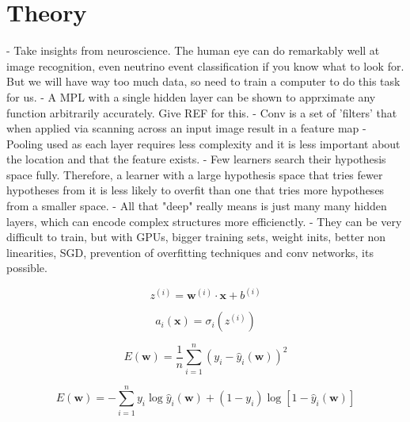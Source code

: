 \section{Theory}
\label{sec:cvn_theory}
- Take insights from neuroscience. The human eye can do remarkably well at image recognition, even neutrino event classification if
you know what to look for. But we will have way too much data, so need to train a computer to do this task for us.
- A MPL with a single hidden layer can be shown to apprximate any function arbitrarily accurately. Give REF for this.
- Conv is a set of 'filters' that when applied via scanning across an input image result in a feature map
- Pooling used as each layer requires less complexity and it is less important about the location and that the feature exists.
- Few learners search their hypothesis space fully. Therefore, a learner with a large hypothesis space that tries fewer hypotheses from it is less likely to overfit than one that tries more hypotheses from a smaller space.
- All that "deep" really means is just many many hidden layers, which can encode complex structures more efficienctly.
- They can be very difficult to train, but with GPUs, bigger training sets, weight inits, better non linearities, SGD, prevention of overfitting techniques and conv networks, its possible.

\begin{equation} %
    z^{(i)}=\boldsymbol{w}^{(i)}\cdot\boldsymbol{x}+b^{(i)}
\end{equation} %

\begin{equation} %
    a_{i}(\boldsymbol{x})=\sigma_i(z^{(i)})
\end{equation} %

\begin{equation} %
    E(\boldsymbol{w})=
    \frac{1}{n}\displaystyle\sum_{i=1}^{n}(y_{i}-
    \hat{y}_{i}(\boldsymbol{w}))^{2}
\end{equation} %

\begin{equation} %
    E(\boldsymbol{w})=
    -\displaystyle\sum_{i=1}^{n}y_{i}\log\hat{y}_{i}(\boldsymbol{w})+
    (1-y_{i})\log[1-\hat{y}_{i}(\boldsymbol{w})]
\end{equation} %

